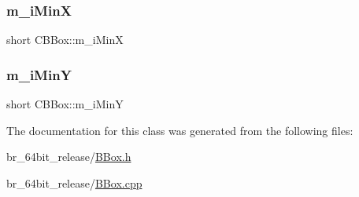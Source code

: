 \subsubsection{\texorpdfstring{m\_iMinX}{m\_iMinX}}
{\footnotesize\ttfamily short C\+B\+Box\+::m\+\_\+i\+MinX\hspace{0.3cm}{\ttfamily [protected]}}

\mbox{\label{classCBBox_afa02f0bfb935a21e343d172c5031de5d}} 
\subsubsection{\texorpdfstring{m\_iMinY}{m\_iMinY}}
{\footnotesize\ttfamily short C\+B\+Box\+::m\+\_\+i\+MinY\hspace{0.3cm}{\ttfamily [protected]}}



The documentation for this class was generated from the following files\+:\begin{DoxyCompactItemize}
\item 
br\+\_\+64bit\+\_\+release/\mbox{\hyperlink{BBox_8h}{B\+Box.\+h}}\item 
br\+\_\+64bit\+\_\+release/\mbox{\hyperlink{BBox_8cpp}{B\+Box.\+cpp}}\end{DoxyCompactItemize}
